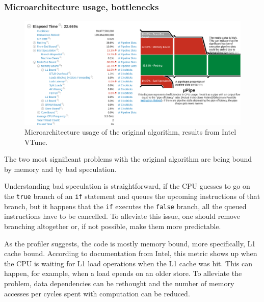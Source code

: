 \documentclass[12pt]{article}
\newcommand{\code}[1]{\texttt{#1}}
\begin{document}
\subsubsection{Microarchitecture usage, bottlenecks}

\begin{figure}[H]
	\begin{center}
		\includegraphics[width=\textwidth]{velout_uarch_overall_orig}
	\end{center}
	\caption{Microarchitecture usage of the original algorithm, results from Intel VTune.}
	\label{fig_velout_uarch_overall_orig}
\end{figure}

The two most significant problems with the original algorithm are being bound by memory and by bad speculation.

Understanding bad speculation is straightforward, if the CPU guesses to go on the \code{true} branch of an \code{if} statement and queues the upcoming instructions of that branch, but it happens that the \code{if} executes the \code{false} branch, all the queued instructions have to be cancelled.\cite{intel_vtune_docs} To alleviate this issue, one should remove branching altogether or, if not possible, make them more predictable.

As the profiler suggests, the code is mostly memory bound, more specifically, L1 cache bound. According to documentation from Intel, this metric shows up when the CPU is waiting for L1 load operations when the L1 cache was hit. This can happen, for example, when a load epends on an older store. To alleviate the problem, data dependencies can be rethought and the number of memory accesses per cycles spent with computation can be reduced.\cite{intel_vtune_docs}
\end{document}
